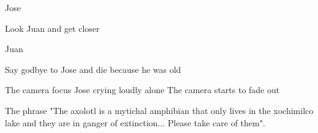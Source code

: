 \documentclass{screenplay}[2012/06/30]
\begin{document}
\begin{dialogue}[worried]{Jose}
\end{dialogue}

Look Juan and get closer

\begin{dialogue}[calm]{Juan}
\end{dialogue}

Say godbye to Jose and die because he was old

The camera focus Jose crying loudly alone
The camera starts to fade out

The phrase "The axolotl is a mytichal amphibian that only lives in the xochimilco lake and they are in ganger of extinction... Please take care of them".

\theend
\end{document}
